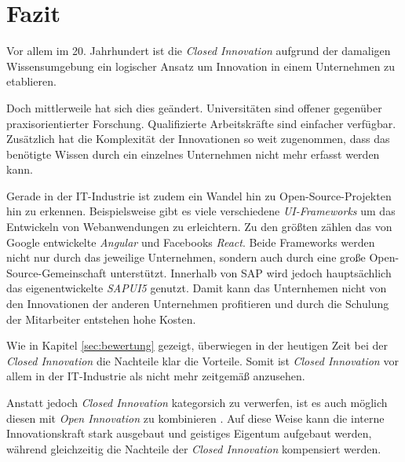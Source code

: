 \section{Fazit}\label{sec:fazit}
Vor allem im 20. Jahrhundert ist die \textit{Closed Innovation}
aufgrund der damaligen Wissensumgebung
ein logischer Ansatz um Innovation in einem Unternehmen zu etablieren.

Doch mittlerweile hat sich dies geändert.
Universitäten sind offener gegenüber praxisorientierter Forschung.
Qualifizierte Arbeitskräfte sind einfacher verfügbar.
Zusätzlich hat die Komplexität der Innovationen so weit zugenommen,
dass das benötigte Wissen durch ein einzelnes Unternehmen nicht mehr erfasst werden kann.

Gerade in der IT-Industrie ist zudem ein Wandel hin zu Open-Source-Projekten hin zu erkennen.
Beispielsweise gibt es viele verschiedene \linebreak{}\textit{UI-Frameworks} um das Entwickeln von Webanwendungen zu erleichtern.
Zu den größten zählen das von Google entwickelte \textit{Angular} und Facebooks \textit{React}.
Beide Frameworks werden nicht nur durch das jeweilige Unternehmen,
sondern auch durch eine große Open-Source-Gemeinschaft unterstützt.
Innerhalb von SAP wird jedoch hauptsächlich das eigenentwickelte \textit{SAPUI5} genutzt.
Damit kann das Unternhemen nicht von den Innovationen der anderen Unternehmen profitieren und
durch die Schulung der Mitarbeiter entstehen hohe Kosten.

Wie in Kapitel \ref{sec:bewertung} gezeigt, überwiegen in der heutigen Zeit bei der \textit{Closed Innovation}
die Nachteile klar die Vorteile.
Somit ist \textit{Closed Innovation} vor allem in der IT-Industrie als nicht mehr zeitgemäß anzusehen.

Anstatt jedoch \textit{Closed Innovation} kategorsich zu verwerfen,
ist es auch möglich diesen mit \textit{Open Innovation} zu kombinieren \cite{OpenInno32:online}.
Auf diese Weise kann die interne Innovationskraft stark ausgebaut und geistiges Eigentum aufgebaut werden,
während gleichzeitig die Nachteile der \textit{Closed Innovation} kompensiert werden.
